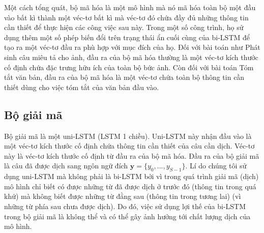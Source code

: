 Một cách tổng quát, bộ mã hóa là một mô hình mà nó mã hóa toàn bộ một đầu vào bất kì thành một véc-tơ bất kì mà véc-tơ đó chứa đầy đủ những thông tin cần thiết để thực hiện các công việc sau này. Trong một số công trình, họ sử dụng thêm một số phép biến đổi trên trạng thái ẩn cuối cùng của bi-LSTM để tạo ra một véc-tơ đầu ra phù hợp với mục đích của họ. Đối với bài toán như Phát sinh câu miêu tả cho ảnh, đầu ra của bộ mã hóa thường là một véc-tơ kích thước cố định chứa đặc trưng hữu ích của toàn bộ bức ảnh. Còn đối với bài toán Tóm tắt văn bản, đầu ra của bộ mã hóa là một véc-tơ chứa toàn bộ thông tin cần thiết dùng cho việc tóm tắt của văn bản đầu vào.


\subsection{Bộ giải mã}
Bộ giải mã là một uni-LSTM (LSTM 1 chiều). Uni-LSTM này nhận đầu vào là một véc-tơ kích thước cố định chứa thông tin cần thiết của câu cần dịch. Véc-tơ này là véc-tơ kích thước cố định từ đầu ra của bộ mã hóa. Đầu ra của bộ giải mã là câu đã được dịch sang ngôn ngữ đích $\bm{y} = \{y_0, ..., y_{S-1}\}$.
Lí do chúng tôi sử dụng uni-LSTM mà không phải là bi-LSTM bởi vì trong quá trình giải mã (dịch) mô hình chỉ biết có được những từ đã được dịch ở trước đó (thông tin trong quá khứ) mà không biết được những từ đằng sau (thông tin trong tương lai) (vì những từ phía sau chưa được dịch). Do đó, việc sử dụng lợi thế của bi-LSTM trong bộ giải mã là không thể và có thể gây ảnh hưởng tới chất lượng dịch của mô hình.

